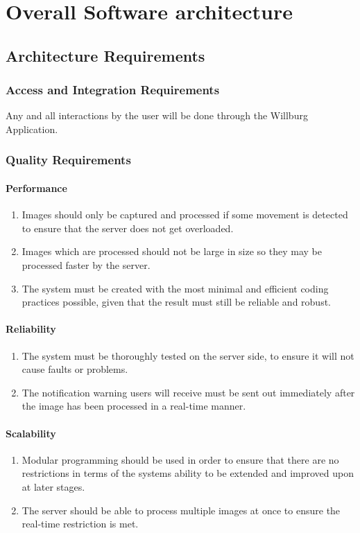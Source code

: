 \documentclass[a4paper,12pt]{report}
\begin{document}
\section {Overall Software architecture}	
\subsection{Architecture Requirements}
\subsubsection{Access and Integration Requirements}
Any and all interactions by the user will be done through the Willburg Application.
\subsubsection{Quality Requirements}
\paragraph{Performance}
\begin{enumerate}
	\item Images should only be captured and processed if some movement is detected to ensure that the server does not get overloaded.
	\item Images which are processed should not be large in size so they may be processed faster by the server.
	\item The system must be created with the most minimal and efficient coding
	practices possible, given that the result must still be reliable and robust.
\end{enumerate}
\paragraph{Reliability}
\begin{enumerate}
	\item The system must be thoroughly tested on the server side, to
	ensure it will not cause faults or problems. 
	\item The notification warning users will receive must be sent out immediately after the image has been processed in a real-time manner.
\end{enumerate}
\paragraph{Scalability}
\begin{enumerate}
	\item Modular programming should be used in order to ensure that there are no restrictions in terms of the systems ability to be extended and improved upon at later stages.
	\item The server should be able to process multiple images at once to ensure the real-time restriction is met.
\end{enumerate}
\end{document}
